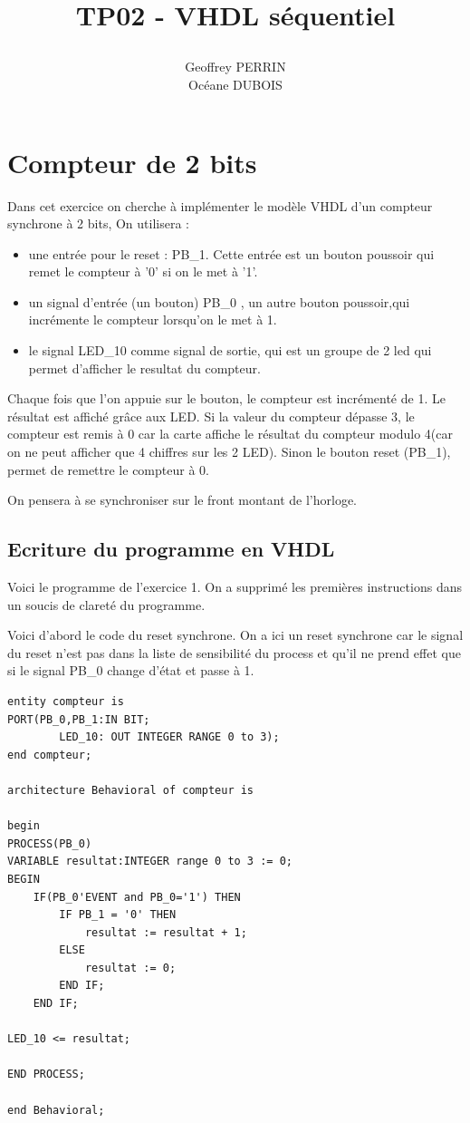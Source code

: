 \documentclass[11pt]{report}
\title{\textbf{TP02 - VHDL séquentiel}
\author{Geoffrey PERRIN \\ Océane DUBOIS\\}
\date{}}
\begin{document}
\maketitle

\newpage


\section{Compteur de 2 bits}

Dans cet exercice on cherche à implémenter le  modèle VHDL d'un compteur synchrone à 2 bits,
On utilisera : \begin{itemize}
	 \item  une entrée  pour le reset : PB\_1. Cette entrée est un bouton poussoir qui remet le compteur à '0' si on le met à '1'.
	\item un signal d'entrée (un bouton) PB\_0 , un autre bouton poussoir,qui incrémente le compteur lorsqu'on le met à 1.
	 \item le signal LED\_10 comme signal de sortie, qui est un groupe de 2 led qui permet d'afficher le resultat du compteur.

	\end{itemize}

\medskip

Chaque fois que l'on appuie sur le bouton, le compteur est incrémenté de 1. Le résultat est affiché grâce aux LED. Si la valeur du compteur dépasse 3, le compteur est remis à 0 car la carte affiche le résultat du compteur modulo 4(car on ne peut afficher que 4 chiffres sur les 2 LED). Sinon le bouton reset (PB\_1), permet de remettre le compteur à 0.

\medskip

On pensera à se synchroniser sur le front montant de l'horloge.

\subsection{ Ecriture du programme en VHDL}

Voici le programme de l'exercice 1. On a supprimé les premières instructions dans un soucis de clareté du programme.

Voici d'abord le code du reset synchrone. On a ici un reset synchrone car le signal du reset n'est pas dans la liste de sensibilité du process et qu'il ne prend effet que si le signal PB\_0 change d'état et passe à 1.

\begin{lstlisting}
entity compteur is
PORT(PB_0,PB_1:IN BIT;
		LED_10: OUT INTEGER RANGE 0 to 3);
end compteur;

architecture Behavioral of compteur is

begin
PROCESS(PB_0)
VARIABLE resultat:INTEGER range 0 to 3 := 0;
BEGIN
	IF(PB_0'EVENT and PB_0='1') THEN
		IF PB_1 = '0' THEN
			resultat := resultat + 1;
		ELSE
			resultat := 0;
		END IF;
	END IF;

LED_10 <= resultat;

END PROCESS;

end Behavioral;

\end{lstlisting}
\end{document}
